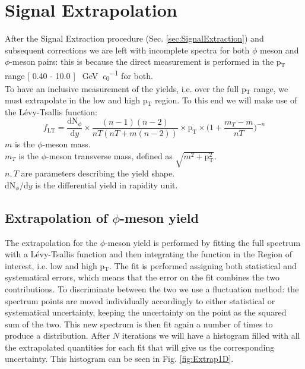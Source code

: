\section{Signal Extrapolation}
\label{sec:SignalExtrapolation}
After the Signal Extraction procedure (Sec. \ref{sec:SignalExtraction}) and subsequent corrections we are left with incomplete spectra for both $\phi$ meson and $\phi$-meson pairs: this is because the direct measurement is performed in the p$_{\text{T}}$ range [ 0.40 - 10.0 ] \SI{}{\giga\electronvolt\per\clight} for both.\\
\indent To have an inclusive measurement of the yields, i.e. over the full p$_{\text{T}}$ range, we must extrapolate in the low and high p$_{\text{T}}$ region. To this end we will make use of the L\'evy-Tsallis function:
\begin{equation}
\label{eq:levy-tsallis}
f_{\text{LT}} = \frac{\text{dN}_{\phi}}{\text{d}y}\times\frac{(n-1)(n-2)}{nT(nT+m(n-2))}\times\text{p}_{\text{T}}\times\Big( 1+ \frac{m_{T} -m}{nT} \Big)^{-n}
\end{equation}
\textbf{$m$} is the $\phi$-meson mass.\\
\textbf{$m_{T}$} is the $\phi$-meson transverse mass, defined as $\sqrt{m^2+\text{p}_{\text{T}}^2}$.\\
\textbf{$n, T$} are parameters describing the yield shape.\\
\textbf{$\text{dN}_{\phi}/\text{d}y$} is the differential yield in rapidity unit.\\

\subsection{Extrapolation of $\phi$-meson yield}
The extrapolation for the $\phi$-meson yield is performed by fitting the full spectrum with a L\'evy-Tsallis function and then integrating the function in the Region of interest, i.e. low and high p$_{\text{T}}$. The fit is performed assigning both statistical and systematical errors, which means that the error on the fit combines the two contributions. To discriminate between the two we use a fluctuation method: the spectrum points are moved individually accordingly to either statistical or systematical uncertainty, keeping the uncertainty on the point as the squared sum of the two. This new spectrum is then fit again a number of times to produce a distribution. After $N$ iterations we will have a histogram filled with all the extrapolated quantities for each fit that will give us the corresponding uncertainty. This histogram can be seen in Fig. \ref{fig:Extrap1D}.

